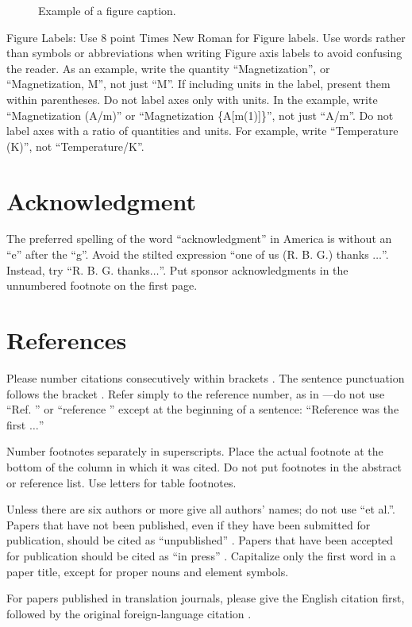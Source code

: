 \documentclass[10pt, conference, letterpaper]{IEEEtran}
\begin{document}
\begin{figure}[htbp]
\caption{Example of a figure caption.}
\label{fig}
\end{figure}

Figure Labels: Use 8 point Times New Roman for Figure labels. Use words 
rather than symbols or abbreviations when writing Figure axis labels to 
avoid confusing the reader. As an example, write the quantity 
``Magnetization'', or ``Magnetization, M'', not just ``M''. If including 
units in the label, present them within parentheses. Do not label axes only 
with units. In the example, write ``Magnetization (A/m)'' or ``Magnetization 
\{A[m(1)]\}'', not just ``A/m''. Do not label axes with a ratio of 
quantities and units. For example, write ``Temperature (K)'', not 
``Temperature/K''.

\section*{Acknowledgment}

The preferred spelling of the word ``acknowledgment'' in America is without 
an ``e'' after the ``g''. Avoid the stilted expression ``one of us (R. B. 
G.) thanks $\ldots$''. Instead, try ``R. B. G. thanks$\ldots$''. Put sponsor 
acknowledgments in the unnumbered footnote on the first page.

\section*{References}

Please number citations consecutively within brackets \cite{b1}. The 
sentence punctuation follows the bracket \cite{b2}. Refer simply to the reference 
number, as in \cite{b3}---do not use ``Ref. \cite{b3}'' or ``reference \cite{b3}'' except at 
the beginning of a sentence: ``Reference \cite{b3} was the first $\ldots$''

Number footnotes separately in superscripts. Place the actual footnote at 
the bottom of the column in which it was cited. Do not put footnotes in the 
abstract or reference list. Use letters for table footnotes.

Unless there are six authors or more give all authors' names; do not use 
``et al.''. Papers that have not been published, even if they have been 
submitted for publication, should be cited as ``unpublished'' \cite{b4}. Papers 
that have been accepted for publication should be cited as ``in press'' \cite{b5}. 
Capitalize only the first word in a paper title, except for proper nouns and 
element symbols.

For papers published in translation journals, please give the English 
citation first, followed by the original foreign-language citation \cite{b6}.



\end{document}
